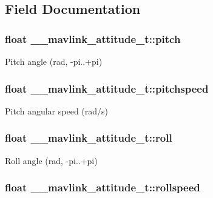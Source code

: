 \subsection{Field Documentation}
\hypertarget{struct____mavlink__attitude__t_ad9be17d1bb5941060e7c81634ebec51c}{
\subsubsection[{pitch}]{\setlength{\rightskip}{0pt plus 5cm}float \+\_\+\+\_\+mavlink\+\_\+attitude\+\_\+t\+::pitch}}\label{struct____mavlink__attitude__t_ad9be17d1bb5941060e7c81634ebec51c}


Pitch angle (rad, -\/pi..+pi) 

\hypertarget{struct____mavlink__attitude__t_a6496f9102154455ef47db7c0cab5c141}{
\subsubsection[{pitchspeed}]{\setlength{\rightskip}{0pt plus 5cm}float \+\_\+\+\_\+mavlink\+\_\+attitude\+\_\+t\+::pitchspeed}}\label{struct____mavlink__attitude__t_a6496f9102154455ef47db7c0cab5c141}


Pitch angular speed (rad/s) 

\hypertarget{struct____mavlink__attitude__t_a5ac57ac7109bca27a72d5a4128a8010f}{
\subsubsection[{roll}]{\setlength{\rightskip}{0pt plus 5cm}float \+\_\+\+\_\+mavlink\+\_\+attitude\+\_\+t\+::roll}}\label{struct____mavlink__attitude__t_a5ac57ac7109bca27a72d5a4128a8010f}


Roll angle (rad, -\/pi..+pi) 

\hypertarget{struct____mavlink__attitude__t_ae46e19a3dc0bde80d9a0eddbc0f9315d}{
\subsubsection[{rollspeed}]{\setlength{\rightskip}{0pt plus 5cm}float \+\_\+\+\_\+mavlink\+\_\+attitude\+\_\+t\+::rollspeed}}\label{struct____mavlink__attitude__t_ae46e19a3dc0bde80d9a0eddbc0f9315d}


